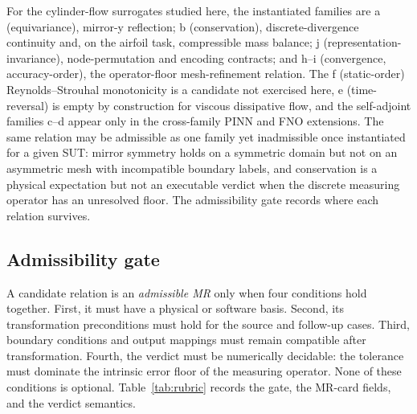 \documentclass[preprint,12pt]{elsarticle}
\begin{document}
For the cylinder-flow surrogates studied here, the instantiated families are a (equivariance), mirror-y reflection; b (conservation), discrete-divergence continuity and, on the airfoil task, compressible mass balance; j (representation-invariance), node-permutation and encoding contracts; and h--i (convergence, accuracy-order), the operator-floor mesh-refinement relation. The f (static-order) Reynolds--Strouhal monotonicity is a candidate not exercised here, e (time-reversal) is empty by construction for viscous dissipative flow, and the self-adjoint families c--d appear only in the cross-family PINN and FNO extensions. The same relation may be admissible as one family yet inadmissible once instantiated for a given SUT: mirror symmetry holds on a symmetric domain but not on an asymmetric mesh with incompatible boundary labels, and conservation is a physical expectation but not an executable verdict when the discrete measuring operator has an unresolved floor. The admissibility gate records where each relation survives.

\subsection{Admissibility gate}
\label{subsec:rubric}

A candidate relation is an \emph{admissible MR} only when four conditions hold together. First, it must have a physical or software basis. Second, its transformation preconditions must hold for the source and follow-up cases. Third, boundary conditions and output mappings must remain compatible after transformation. Fourth, the verdict must be numerically decidable: the tolerance must dominate the intrinsic error floor of the measuring operator. None of these conditions is optional. Table~\ref{tab:rubric} records the gate, the MR-card fields, and the verdict semantics.
\end{document}
